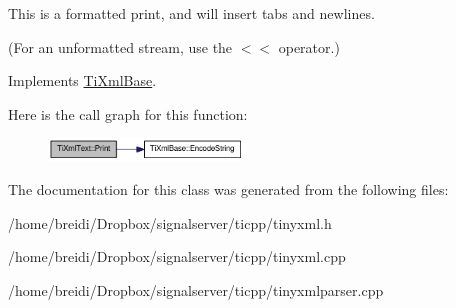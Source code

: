This is a formatted print, and will insert tabs and newlines.

(For an unformatted stream, use the $<$$<$ operator.) 

Implements \hyperlink{class_ti_xml_base_a0de56b3f2ef14c65091a3b916437b512}{TiXmlBase}.

Here is the call graph for this function:\nopagebreak
\begin{figure}[H]
\begin{center}
\leavevmode
\includegraphics[width=147pt]{class_ti_xml_text_ae74d56c5b3ddec6cc3103dd51821af92_cgraph}
\end{center}
\end{figure}


The documentation for this class was generated from the following files:\begin{DoxyCompactItemize}
\item 
/home/breidi/Dropbox/signalserver/ticpp/tinyxml.h\item 
/home/breidi/Dropbox/signalserver/ticpp/tinyxml.cpp\item 
/home/breidi/Dropbox/signalserver/ticpp/tinyxmlparser.cpp\end{DoxyCompactItemize}
